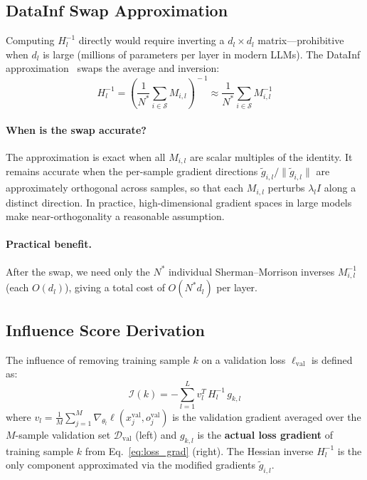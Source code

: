 \documentclass{article}
\begin{document}
\subsection{DataInf Swap Approximation}\label{sec:datainf_swap}

Computing $H_l^{-1}$ directly would require inverting a $d_l \times d_l$ matrix---prohibitive when $d_l$ is large (millions of parameters per layer in modern LLMs).
The DataInf approximation~\cite{} swaps the average and inversion:
\begin{equation}\label{eq:swap}
    H_l^{-1}
    = \left(\frac{1}{N^*}\sum_{i\in\mathcal{S}} M_{i,l}\right)^{\!-1}
    \approx \frac{1}{N^*}\sum_{i\in\mathcal{S}} M_{i,l}^{-1}
\end{equation}

\paragraph{When is the swap accurate?}
The approximation is exact when all $M_{i,l}$ are scalar multiples of the identity.
It remains accurate when the per-sample gradient directions $\tilde{g}_{i,l}/\|\tilde{g}_{i,l}\|$ are approximately orthogonal across samples, so that each $M_{i,l}$ perturbs $\lambda_l I$ along a distinct direction.
In practice, high-dimensional gradient spaces in large models make near-orthogonality a reasonable assumption.

\paragraph{Practical benefit.}
After the swap, we need only the $N^*$ individual Sherman--Morrison inverses $M_{i,l}^{-1}$ (each $O(d_l)$), giving a total cost of $O(N^*d_l)$ per layer.

\subsection{Influence Score Derivation}\label{sec:influence_derivation}

The influence of removing training sample $k$ on a validation loss $\ell_{\mathrm{val}}$ is defined as:
\begin{equation}\label{eq:influence_def}
    \mathcal{I}(k) = -\sum_{l=1}^{L} v_l^T\,H_l^{-1}\,g_{k,l}
\end{equation}
where $v_l = \frac{1}{M}\sum_{j=1}^{M}\nabla_{\theta_l}\ell(x_j^{\mathrm{val}},o_j^{\mathrm{val}})$ is the validation gradient averaged over the $M$-sample validation set $\mathcal{D}_{\mathrm{val}}$ (left) and $g_{k,l}$ is the \textbf{actual loss gradient} of training sample $k$ from Eq.~\eqref{eq:loss_grad} (right).
The Hessian inverse $H_l^{-1}$ is the only component approximated via the modified gradients $\tilde{g}_{i,l}$.
\end{document}
